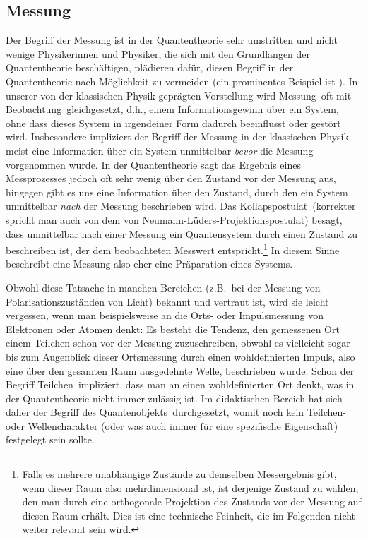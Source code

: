 \subsection{Messung}

Der Begriff der Messung ist in der Quantentheorie sehr umstritten und nicht wenige
Physikerinnen und Physiker, die sich mit den Grundlangen der Quantentheorie besch\"aftigen, pl\"adieren
daf\"ur, diesen Begriff in der Quantentheorie nach M\"oglichkeit zu vermeiden (ein 
prominentes Beispiel ist \cite{Bell}). In unserer von
der klassischen Physik gepr\"agten Vorstellung wird \glqq Messung\grqq\ oft mit \glqq Beobachtung\grqq\ gleichgesetzt,
d.h., einem Informationsgewinn \"uber ein System, ohne dass dieses System in irgendeiner
Form dadurch beeinflusst oder gest\"ort wird. Insbesondere impliziert der Begriff der Messung in
der klassischen Physik meist eine 
Information \"uber ein System unmittelbar \textit{bevor} die Messung vorgenommen
wurde. In der Quantentheorie sagt das Ergebnis eines Messprozesses jedoch oft sehr wenig
\"uber den Zustand vor der Messung aus, hingegen gibt es uns eine Information \"uber den
Zustand, durch den ein System unmittelbar \textit{nach} der 
Messung beschrieben wird. 
Das \glqq Kollapspostulat\grqq\ (korrekter spricht man auch von dem 
\glqq von Neumann-L\"uders-Projektionspostulat\grqq) besagt, dass
unmittelbar nach einer Messung ein Quantensys\-tem durch einen Zustand zu beschreiben ist, der
dem beobachteten Messwert entspricht.\footnote{Falls es mehrere unabh\"angige Zust\"ande
zu demselben Messergebnis gibt, wenn dieser Raum also mehrdimensional ist, ist derjenige Zustand zu 
w\"ahlen, den man durch eine orthogonale Projektion des Zustands vor der Messung auf diesen Raum 
erh\"alt. Dies ist eine technische Feinheit, die im Folgenden nicht weiter relevant sein wird.}
In diesem Sinne beschreibt eine Messung also eher eine Pr\"aparation eines Systems.

Obwohl diese Tatsache in manchen Bereichen (z.B.\ bei der Messung von Polarisationszust\"anden
von Licht) bekannt und vertraut ist, wird sie leicht vergessen, wenn man beispielsweise an die Orts- oder
Impulsmessung von Elektronen oder Atomen denkt: Es besteht die Tendenz, den gemessenen Ort
einem Teilchen schon vor der Messung zuzuschreiben, obwohl es vielleicht sogar bis zum
Augenblick dieser Ortsmessung durch einen wohldefinierten Impuls, also eine \"uber den gesamten Raum
ausgedehnte Welle, beschrieben wurde. Schon der Begriff \glqq Teilchen\grqq\ impliziert, dass
man an einen wohldefinierten Ort denkt, was in der Quantentheorie nicht immer zul\"assig ist. Im 
didaktischen Bereich hat sich daher der Begriff des 
\glqq Quantenobjekts\grqq\ durchgesetzt, womit noch kein
Teilchen- oder Wellencharakter (oder was auch immer f\"ur eine spezifische Eigenschaft) festgelegt sein
sollte.

